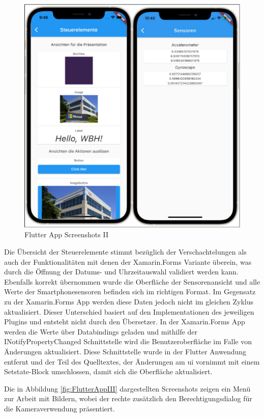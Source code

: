 \begin{figure}[!ht]
 \includegraphics[width=\textwidth,keepaspectratio]{Images/Screenshot/Flutter2ios.png}
 \caption{Flutter App Screenshots II}
 \label{fig:FlutterAppII}
\end{figure}
Die Übersicht der Steuerelemente stimmt  bezüglich der Verschachtelungen als auch der Funktionalitäten mit denen der Xamarin.Forms Variante überein,  was durch die Öffnung der Datums- und Uhrzeitauswahl validiert werden kann.  Ebenfalls korrekt übernommen wurde die Oberfläche der Sensorenansicht und alle Werte der Smartphonesensoren befinden sich im richtigen Format. Im Gegensatz zu der Xamarin.Forms App werden diese Daten jedoch nicht im gleichen Zyklus aktualisiert.  Dieser Unterschied basiert auf den Implementationen des jeweiligen Plugins und entsteht nicht durch den Übersetzer.  In der Xamarin.Forms App werden die Werte über Databindings geladen und mithilfe der \glq INotifyPropertyChanged\grq{} Schnittstelle wird die Benutzeroberfläche im Falle von Änderungen aktualisiert.  Diese Schnittstelle wurde in der Flutter Anwendung entfernt und der Teil des Quelltextes,  der Änderungen am \ac{ui} vornimmt mit einem Setstate-Block umschlossen,  damit sich die Oberfläche aktualisiert.  

Die in Abbildung \ref{fig:FlutterAppIII} dargestellten Screenshots zeigen ein Menü zur Arbeit mit Bildern, wobei der rechte zusätzlich den Berechtigungsdialog für die Kameraverwendung präsentiert. 
  
